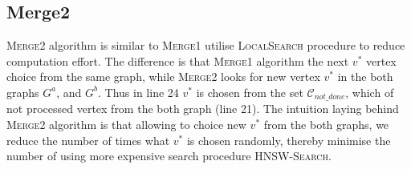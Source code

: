\documentclass{article}
\begin{document}
\subsection{Merge2}

\textsc{Merge2} algorithm is similar to \textsc{Merge1} utilise \textsc{LocalSearch} procedure to reduce computation effort. The difference is that \textsc{Merge1} algorithm the next $v^*$ vertex choice from the same graph, while \textsc{Merge2} looks for new vertex $v^*$ in the both graphs $G^a$, and $G^b$. 
Thus in line 24  $v^*$  is chosen from the set $\mathcal{C}_{not\_done}$, which of not processed vertex from the both graph (line 21). The intuition laying behind \textsc{Merge2} algorithm is that allowing to choice new $v^*$ from the both graphs, we reduce the number of times what $v^*$ is chosen randomly, thereby minimise the number of using more expensive search procedure \textsc{HNSW-Search}.
\end{document}
